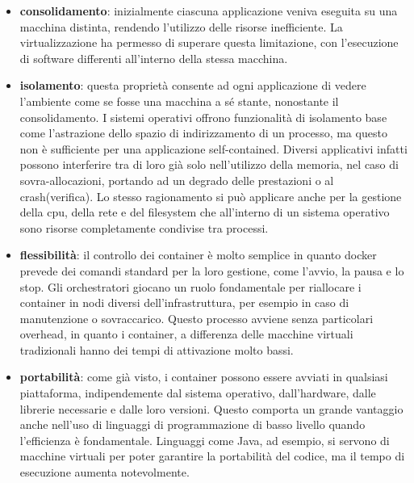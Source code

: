 \begin{itemize}
	\item \textbf{consolidamento}: inizialmente ciascuna applicazione veniva eseguita su una macchina distinta, rendendo l'utilizzo delle risorse inefficiente. La virtualizzazione ha permesso di superare questa limitazione, con l'esecuzione di software differenti all'interno della stessa macchina.
	\item \textbf{isolamento}: questa proprietà consente ad ogni applicazione di vedere l'ambiente come se fosse una macchina a sé stante, nonostante il consolidamento. I sistemi operativi offrono funzionalità di isolamento base come l'astrazione dello spazio di indirizzamento di un processo, ma questo non è sufficiente per una applicazione self-contained. Diversi applicativi infatti possono interferire tra di loro già solo nell'utilizzo della memoria, nel caso di sovra-allocazioni, portando ad un degrado delle prestazioni o al crash(verifica). Lo stesso ragionamento si può applicare anche per la gestione della cpu, della rete e del filesystem che all'interno di un sistema operativo sono risorse completamente condivise tra processi. 
	\item \textbf{flessibilità}: il controllo dei container è molto semplice in quanto docker prevede dei comandi standard per la loro gestione, come l'avvio, la pausa e lo stop. Gli orchestratori giocano un ruolo fondamentale per riallocare i container in nodi diversi dell'infrastruttura, per esempio in caso di manutenzione o sovraccarico. Questo processo avviene senza particolari overhead, in quanto i container, a differenza delle macchine virtuali tradizionali hanno dei tempi di attivazione molto bassi.
	\item \textbf{portabilità}: come già visto, i container possono essere avviati in qualsiasi piattaforma, indipendemente dal sistema operativo, dall'hardware, dalle librerie necessarie e dalle loro versioni. Questo comporta un grande vantaggio anche nell'uso di linguaggi di programmazione di basso livello quando l'efficienza è fondamentale. Linguaggi come Java, ad esempio, si servono di macchine virtuali per poter garantire la portabilità del codice, ma il tempo di esecuzione aumenta notevolmente. 
\end{itemize}

